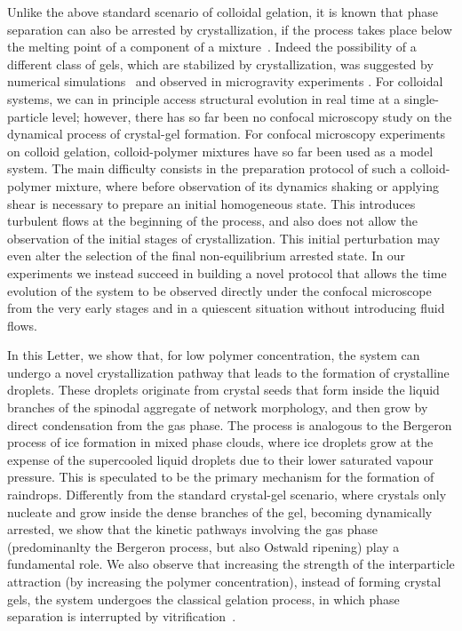 \documentclass[preprint,amsmath,amssymb,superscriptaddress]{revtex4-1}
\begin{document}
Unlike the above standard scenario of colloidal gelation, it is known that phase separation can also be arrested by crystallization, if the process takes place below the melting point of a component of a mixture~\cite{tanaka1985new}. Indeed the possibility of a different class of gels, which are stabilized by crystallization, 
was suggested by numerical simulations~\cite{soga1999metastable,fortini2008crystallization,perez2011pathways} and observed in microgravity experiments \cite{sabin2012}. 
For colloidal systems, we can in principle access structural evolution in real time at a single-particle level; however, there has so far been no confocal microscopy  
study on the dynamical process of crystal-gel formation. 
For confocal microscopy experiments on colloid gelation, colloid-polymer mixtures have so far been used as a model system. 
The main difficulty consists in the preparation protocol of such a colloid-polymer mixture, where before observation of its dynamics shaking or applying shear is necessary to prepare an initial homogeneous state. This introduces turbulent flows at the beginning of the process, and also does not allow the
observation of the initial stages of crystallization. This initial perturbation may even alter the selection of the final non-equilibrium arrested state.  
In our experiments we instead succeed in building a novel protocol that allows the time evolution of the system to be observed directly
under the confocal microscope from the very early stages and in a quiescent situation without introducing fluid flows. 

In this Letter, we show that, for low polymer concentration, the system can undergo a novel crystallization pathway that leads to the formation
of crystalline droplets. These droplets originate from crystal seeds that form inside the liquid branches of the spinodal aggregate of network morphology, and then grow by direct condensation from the gas phase. The process is analogous to the Bergeron process of ice formation in mixed phase clouds, where ice droplets grow at the
expense of the supercooled liquid droplets due to their lower saturated vapour pressure. 
This is speculated to be the primary mechanism for the formation of raindrops. 
Differently from the standard crystal-gel scenario, where crystals only nucleate and grow inside the dense branches of the gel, becoming dynamically arrested, we show that the kinetic
pathways involving the gas phase (predominanlty the Bergeron process, but also Ostwald ripening) play a fundamental role. We also observe that increasing the strength of the interparticle attraction
(by increasing the polymer concentration), instead of forming crystal gels, the system undergoes the classical gelation process, in which
phase separation is interrupted by vitrification~\cite{verhaegh1997transient,tanaka1999colloid,Royall2007,lu2008gelation}. 
\end{document}
